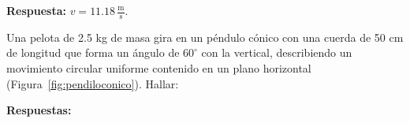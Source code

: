 \documentclass[addpoints]{exam}
\newcommand{\grado}[0]{^{\circ}}
\newcommand{\rta}{\textbf{Respuesta: }}
\newcommand{\rtas}{\textbf{Respuestas: }}
\begin{document}
\begin{questions}
    \rta $v = 11.18 \, \frac{\text{m}}{\text{s}}$.

    \question Una pelota de 2.5 kg de masa gira en un péndulo cónico con una cuerda de 50 cm de longitud que forma un ángulo de $60\grado$ con la vertical, describiendo un movimiento circular uniforme contenido en  un plano horizontal (Figura~\ref{fig:pendiloconico}). Hallar: \label{ej:pendulo_conico}

    \rtas


\end{questions}
\end{document}
